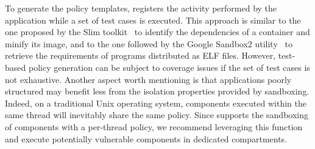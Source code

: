 To generate the policy templates, \dmng registers the activity
performed by the application while a set of test cases is
executed. This approach is similar to the one proposed by the Slim
toolkit~\cite{slimtoolkit} to identify the dependencies of a container
and minify its image, and to the one followed by the Google Sandbox2
utility~\cite{sandbox2} to retrieve the requirements of programs
distributed as ELF files. However, test-based policy generation can be
subject to coverage issues if the set of test cases is not
exhaustive. Another aspect worth mentioning is that applications
poorly structured may benefit less from the isolation properties
provided by sandboxing. Indeed, on a traditional Unix operating
system, components executed within the same thread will inevitably
share the same policy. Since \dmng supports the sandboxing of
components with a per-thread policy, we recommend leveraging this
function and execute potentially vulnerable components in dedicated
compartments.

